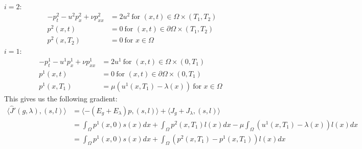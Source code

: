 \documentclass[11pt,a4paper]{report}
\begin{document}
\\
$i=2$:
\begin{align*}
-p_t^2 -u^2p_x^2 + \nu p_{xx}^2 &= 2u^2 \ \text{for $(x,t)\in \Omega\times(T_1,T_2)$}\\
p^2(x,t) &= 0 \ \text{for $(x,t) \in\partial\Omega\times(T_1,T_2)$ } \\
p^2(x,T_2) &= 0 \ \text{for $x \in\Omega$ }
\end{align*}
$i=1$:
\begin{align*}
-p_t^1 -u^1p_x^1 + \nu p_{xx}^1 &= 2u^1 \ \text{for $(x,t)\in \Omega\times(0,T_1)$}\\
p^1(x,t) &= 0 \ \text{for $(x,t) \in\partial\Omega\times(0,T_1)$ } \\
p^1(x,T_1) &= \mu(u^1(x,T_1)-\lambda(x)) \ \text{for $x \in\Omega$ }
\end{align*}
This gives us the following gradient:
\begin{align*}
\langle \hat{J}'(g,\lambda), (s,l)\rangle &=\langle -(E_g+E_{\lambda})p , (s,l)\rangle + \langle J_g+J_{\lambda}, (s,l)\rangle \\
&= \int_{\Omega} p^1(x,0)s(x)dx + \int_{\Omega} p^2(x,T_1)l(x)dx -\mu\int_{\Omega} (u^1(x,T_1)-\lambda(x))l(x)dx \\
&= \int_{\Omega} p^1(x,0)s(x)dx + \int_{\Omega} (p^2(x,T_1)-p^1(x,T_1))l(x)dx
\end{align*}
\end{document}
